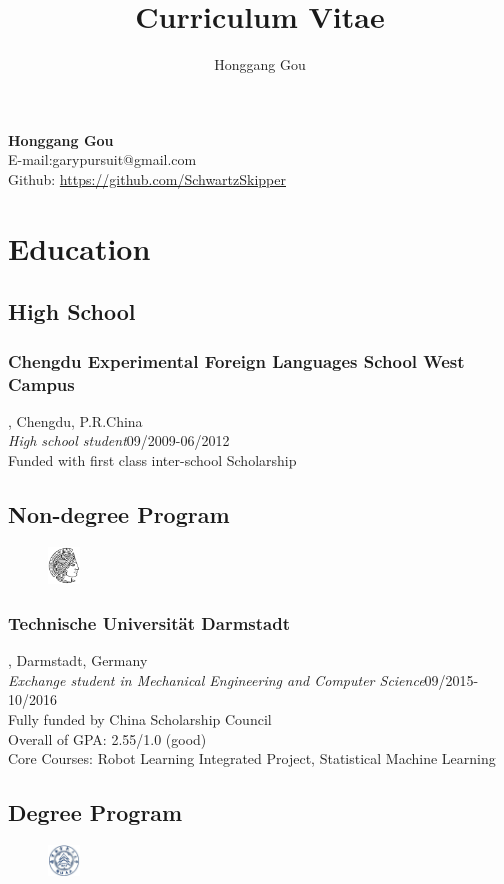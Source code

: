\documentclass{article}
\makeatletter
\renewcommand{\maketitle}{
\begin{center}
{\Large\bfseries
Honggang Gou\\}
\vspace{0em}
E-mail:garypursuit@gmail.com\\
Github: \url{https://github.com/SchwartzSkipper}
\end{center}
}
\makeatother
\begin{document}
   
\title{Curriculum Vitae}
\author{Honggang Gou}

\maketitle

\section{Education}
\subsection{High School}
\subsubsection{Chengdu Experimental Foreign Languages School West Campus}, Chengdu, P.R.China\\
\emph{High school student}{\hfill09/2009-06/2012\\}
Funded with first class inter-school Scholarship
\subsection{Non-degree Program}
\begin{figure}
    \begin{center}
        \includegraphics[width=0.075\textwidth]{./pic/tud.png}
    \end{center}
\end{figure}
\subsubsection{Technische Universit\"at Darmstadt}, Darmstadt, Germany\\
\emph{Exchange student in Mechanical Engineering and Computer Science}{\hfill09/2015-10/2016\\}
Fully funded by China Scholarship Council\\
Overall of GPA: 2.55/1.0 (good)\\
Core Courses: Robot Learning Integrated Project, Statistical Machine Learning\\
\subsection{Degree Program}
\begin{figure}
    \begin{center}
        \includegraphics[width=0.075\textwidth]{./pic/NUAA.jpg}
    \end{center}
\end{figure}
\end{document}
